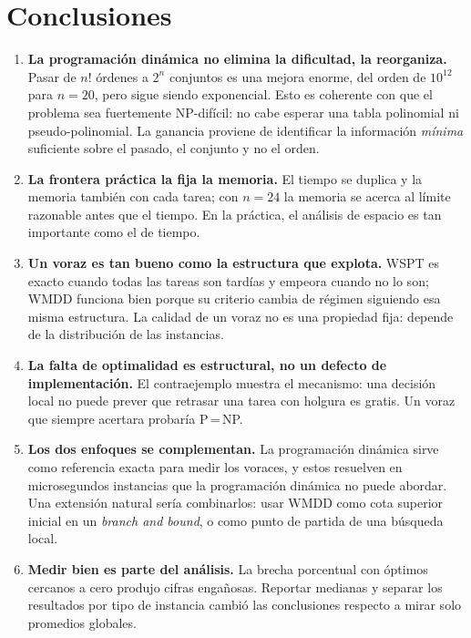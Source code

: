 \documentclass[10pt,twocolumn,letterpaper]{article}
\begin{document}
\section{Conclusiones}

\begin{enumerate}
  \item \textbf{La programación dinámica no elimina la dificultad, la
        reorganiza.} Pasar de $n!$ órdenes a $2^n$ conjuntos es una mejora
        enorme, del orden de $10^{12}$ para $n=20$, pero sigue siendo
        exponencial. Esto es coherente con que el problema sea fuertemente
        NP-difícil: no cabe esperar una tabla polinomial ni pseudo-polinomial.
        La ganancia proviene de identificar la información \emph{mínima}
        suficiente sobre el pasado, el conjunto y no el orden.
  \item \textbf{La frontera práctica la fija la memoria.} El tiempo se duplica
        y la memoria también con cada tarea; con $n=24$ la memoria se acerca
        al límite razonable antes que el tiempo. En la práctica, el análisis de
        espacio es tan importante como el de tiempo.
  \item \textbf{Un voraz es tan bueno como la estructura que explota.} WSPT es
        exacto cuando todas las tareas son tardías y empeora cuando no lo son;
        WMDD funciona bien porque su criterio cambia de régimen siguiendo esa
        misma estructura. La calidad de un voraz no es una propiedad fija: depende
        de la distribución de las instancias.
  \item \textbf{La falta de optimalidad es estructural, no un defecto de
        implementación.} El contraejemplo muestra el mecanismo: una decisión
        local no puede prever que retrasar una tarea con holgura es gratis.
        Un voraz que siempre acertara probaría P\,=\,NP.
  \item \textbf{Los dos enfoques se complementan.} La programación dinámica
        sirve como referencia exacta para medir los voraces, y estos resuelven
        en microsegundos instancias que la programación dinámica no puede
        abordar. Una extensión natural sería combinarlos: usar WMDD como cota
        superior inicial en un \emph{branch and bound}, o como punto de partida
        de una búsqueda local.
  \item \textbf{Medir bien es parte del análisis.} La brecha porcentual con
        óptimos cercanos a cero produjo cifras engañosas. Reportar medianas y
        separar los resultados por tipo de instancia cambió las conclusiones
        respecto a mirar solo promedios globales.
\end{enumerate}
\end{document}
